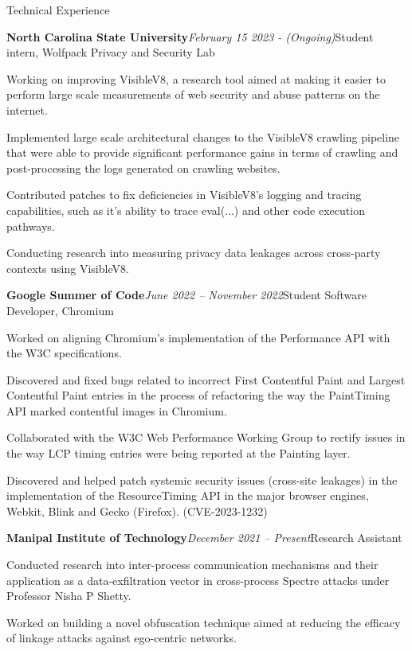 \documentclass{resume} %
\begin{document}
\begin{rSection}{Technical Experience}
\begin{rSubsection}{\bf North Carolina State University}{\em February 15 2023 - (Ongoing)}{Student intern, Wolfpack Privacy and Security Lab}{}
\item Working on improving VisibleV8, a research tool aimed at making it easier to perform large scale measurements of web security and abuse patterns on the internet.
\item Implemented large scale architectural changes to the VisibleV8 crawling pipeline that were able to provide significant performance gains in terms of crawling and post-processing the logs generated on crawling websites.
\item Contributed patches to fix deficiencies in VisibleV8's logging and tracing capabilities, such as it's ability to trace eval(...) and other code execution pathways.
\item Conducting research into measuring privacy data leakages across cross-party contexts using VisibleV8.
\end{rSubsection}
\begin{rSubsection}{\bf Google Summer of Code}{\em June 2022 -- November 2022}{Student Software Developer, Chromium}{}
\item Worked on aligning Chromium's implementation of the Performance API with the W3C specifications.
\item Discovered and fixed bugs related to incorrect First Contentful Paint and Largest Contentful Paint entries in the process of refactoring the way the PaintTiming API marked contentful images in Chromium.
\item Collaborated with the W3C Web Performance Working Group to rectify issues in the way LCP timing entries were being reported at the Painting layer.
\item Discovered and helped patch systemic security issues (cross-site leakages) in the implementation of the ResourceTiming API in the major browser engines, Webkit, Blink and Gecko (Firefox). (CVE-2023-1232)
\end{rSubsection}
\begin{rSubsection}{\bf Manipal Institute of Technology}{\em December 2021 -- Present}{Research Assistant}{}
\item Conducted research into inter-process communication mechanisms and their application as a data-exfiltration vector in cross-process Spectre attacks under Professor Nisha P Shetty.
\item Worked on building a novel obfuscation technique aimed at reducing the efficacy of linkage attacks against ego-centric networks.

\end{rSubsection}
\end{rSection}
\end{document}
